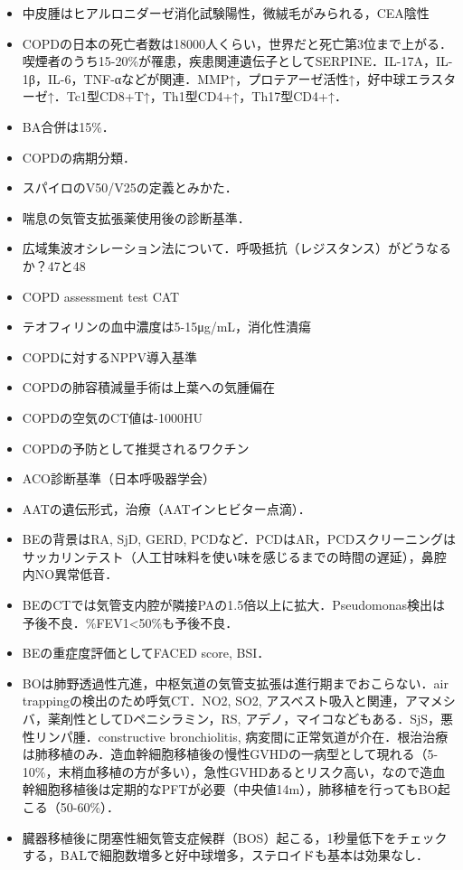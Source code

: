 \begin{itemize}




\item 中皮腫はヒアルロニダーゼ消化試験陽性，微絨毛がみられる，CEA陰性

\item COPDの日本の死亡者数は18000人くらい，世界だと死亡第3位まで上がる．喫煙者のうち15-20\%が罹患，疾患関連遺伝子としてSERPINE．IL-17A，IL-1β，IL-6，TNF-αなどが関連．MMP↑，プロテアーゼ活性↑，好中球エラスターゼ↑．Tc1型CD8+T↑，Th1型CD4+↑，Th17型CD4+↑．
\item BA合併は15\%．
\item COPDの病期分類．
\item スパイロのV50/V25の定義とみかた．
\item 喘息の気管支拡張薬使用後の診断基準．
\item 広域集波オシレーション法について．呼吸抵抗（レジスタンス）がどうなるか？47と48
\item COPD assessment test CAT
\item テオフィリンの血中濃度は5-15μg/mL，消化性潰瘍
\item COPDに対するNPPV導入基準
\item COPDの肺容積減量手術は上葉への気腫偏在
\item COPDの空気のCT値は-1000HU
\item COPDの予防として推奨されるワクチン
\item ACO診断基準（日本呼吸器学会）
\item AATの遺伝形式，治療（AATインヒビター点滴）．
\item BEの背景はRA, SjD, GERD, PCDなど．PCDはAR，PCDスクリーニングはサッカリンテスト（人工甘味料を使い味を感じるまでの時間の遅延），鼻腔内NO異常低音．
\item BEのCTでは気管支内腔が隣接PAの1.5倍以上に拡大．Pseudomonas検出は予後不良．\%FEV1<50\%も予後不良．
\item BEの重症度評価としてFACED score, BSI．
\item BOは肺野透過性亢進，中枢気道の気管支拡張は進行期までおこらない．air trappingの検出のため呼気CT．NO2, SO2, アスベスト吸入と関連，アマメシバ，薬剤性としてDペニシラミン，RS, アデノ，マイコなどもある．SjS，悪性リンパ腫．constructive bronchiolitis, 病変間に正常気道が介在．根治治療は肺移植のみ．造血幹細胞移植後の慢性GVHDの一病型として現れる（5-10\%，末梢血移植の方が多い），急性GVHDあるとリスク高い，なので造血幹細胞移植後は定期的なPFTが必要（中央値14m），肺移植を行ってもBO起こる（50-60\%）．
\item 臓器移植後に閉塞性細気管支症候群（BOS）起こる，1秒量低下をチェックする，BALで細胞数増多と好中球増多，ステロイドも基本は効果なし．


\end{itemize}
